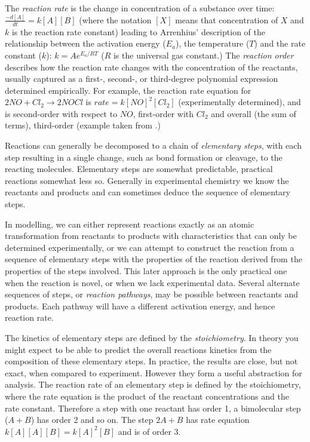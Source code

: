 The \textit{reaction rate} is the change in concentration of a substance over time: \(\frac{-d[A]}{dt} = k[A][B]\) (where the notation \([X]\) means that concentration of \(X\) and \(k\) is the reaction rate constant) leading to Arrenhius' description of the relationship between the activation energy (\(E_a\)), the temperature (\(T\)) and the rate constant (\(k\)): \(k = Ae^{E_a/RT}\) ($R$ is the universal gas constant.) The \textit{reaction order} describes how the reaction rate changes with the concentration of the reactants, usually captured as a first-, second-, or third-degree polynomial expression determined empirically. For example, the reaction rate equation for \(2NO + Cl_2 \rightarrow 2NOCl\) is \(rate = k[NO]^2[Cl_2]\) (experimentally determined), and is second-order with respect to \(NO\), first-order with \(Cl_2\) and overall (the sum of terms), third-order (example taken from \textcite{Kotz2006}.)

Reactions can generally be decomposed to a chain of \emph{elementary steps}, with each step resulting in a single change, such as bond formation or cleavage, to the reacting molecules. Elementary steps are somewhat predictable, practical reactions somewhat less so. Generally in experimental chemistry we know the reactants and products and can sometimes deduce the sequence of elementary steps.

In modelling, we can either represent reactions exactly as an atomic transformation from reactants to products with characteristics that can only be determined experimentally, or we can attempt to construct the reaction from a sequence of elementary steps with the properties of the reaction derived from the properties of the steps involved. This later approach is the only practical one when the reaction is novel, or when we lack experimental data. Several alternate sequences of steps, or \textit{reaction pathways}, may be possible between reactants and products. Each pathway will have a different activation energy, and hence reaction rate.

The kinetics of elementary steps are defined by the \emph{stoichiometry}. In theory you might expect to be able to predict the overall reactions kinetics from the composition of these elementary steps. In practice, the results are close, but not exact, when compared to experiment. However they form a useful abstraction for analysis. The reaction rate of an elementary step is defined by the stoichiometry, where the rate equation is the product of the reactant concentrations and the rate constant. Therefore a step with one reactant has order 1, a bimolecular step (\(A + B\)) has order 2 and so on. The step \(2A + B\) has rate equation \(k[A][A][B] = k[A]^2[B]\) and is of order 3. 

